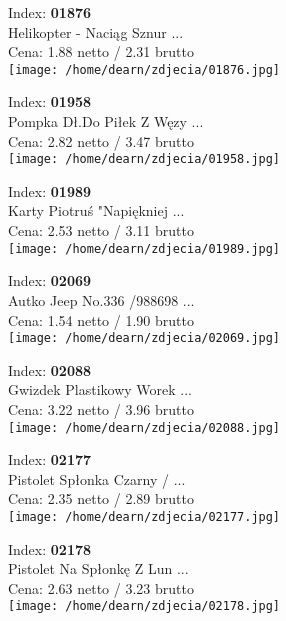 {Index: \textbf{01876}\\
Helikopter - Naciąg Sznur ...\\
Cena: 1.88 netto / 2.31 brutto\\
  \texttt{[image: /home/dearn/zdjecia/01876.jpg]}}\newline\newline

{Index: \textbf{01958}\\
Pompka Dł.Do Piłek Z Węzy ...\\
Cena: 2.82 netto / 3.47 brutto\\
  \texttt{[image: /home/dearn/zdjecia/01958.jpg]}}\newline\newline

{Index: \textbf{01989}\\
Karty Piotruś "Napiękniej ...\\
Cena: 2.53 netto / 3.11 brutto\\
  \texttt{[image: /home/dearn/zdjecia/01989.jpg]}}\newline\newline

{Index: \textbf{02069}\\
Autko Jeep No.336 /988698 ...\\
Cena: 1.54 netto / 1.90 brutto\\
  \texttt{[image: /home/dearn/zdjecia/02069.jpg]}}\newline\newline

{Index: \textbf{02088}\\
Gwizdek Plastikowy Worek  ...\\
Cena: 3.22 netto / 3.96 brutto\\
  \texttt{[image: /home/dearn/zdjecia/02088.jpg]}}\newline\newline

{Index: \textbf{02177}\\
Pistolet Spłonka Czarny / ...\\
Cena: 2.35 netto / 2.89 brutto\\
  \texttt{[image: /home/dearn/zdjecia/02177.jpg]}}\newline\newline

{Index: \textbf{02178}\\
Pistolet Na Spłonkę Z Lun ...\\
Cena: 2.63 netto / 3.23 brutto\\
  \texttt{[image: /home/dearn/zdjecia/02178.jpg]}}\newline\newline

